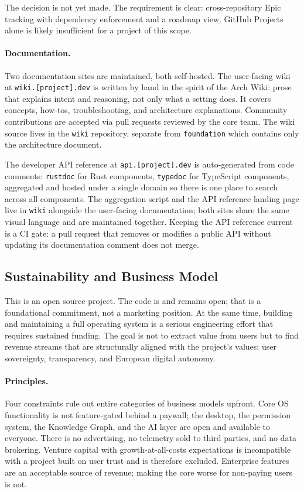 The decision is not yet made. The requirement is clear: cross-repository Epic
tracking with dependency enforcement and a roadmap view. GitHub Projects alone
is likely insufficient for a project of this scope.

\paragraph{Documentation.}
Two documentation sites are maintained, both self-hosted. The user-facing wiki
at \texttt{wiki.[project].dev} is written by hand in the spirit of the Arch
Wiki: prose that explains intent and reasoning, not only what a setting does.
It covers concepts, how-tos, troubleshooting, and architecture explanations.
Community contributions are accepted via pull requests reviewed by the core
team. The wiki source lives in the \texttt{wiki} repository, separate from
\texttt{foundation} which contains only the architecture document.

The developer API reference at \texttt{api.[project].dev} is auto-generated
from code comments: \texttt{rustdoc} for Rust components,
\texttt{typedoc} for TypeScript components, aggregated and hosted under a single
domain so there is one place to search across all components. The aggregation
script and the API reference landing page live in \texttt{wiki} alongside the
user-facing documentation; both sites share the same visual language and are
maintained together. Keeping the API reference current is a CI gate: a pull
request that removes or modifies a public API without updating its documentation
comment does not merge.

\subsection{Sustainability and Business Model}
\label{sec:business}

This is an open source project. The code is and remains open; that is a
foundational commitment, not a marketing position. At the same time, building
and maintaining a full operating system is a serious engineering effort that
requires sustained funding. The goal is not to extract value from users but to
find revenue streams that are structurally aligned with the project's values:
user sovereignty, transparency, and European digital autonomy.

\paragraph{Principles.}
Four constraints rule out entire categories of business models upfront. Core
OS functionality is not feature-gated behind a paywall; the desktop, the
permission system, the Knowledge Graph, and the AI layer are open and available
to everyone. There is no advertising, no telemetry sold to third parties, and
no data brokering. Venture capital with growth-at-all-costs expectations is
incompatible with a project built on user trust and is therefore excluded.
Enterprise features are an acceptable source of revenue; making the core worse
for non-paying users is not.

